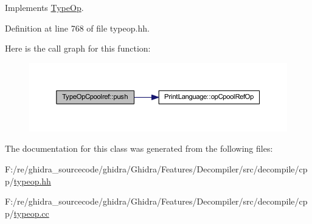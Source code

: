 Implements \mbox{\hyperlink{class_type_op_ac9c9544203ed74dabe6ac662b653b2af}{Type\+Op}}.



Definition at line 768 of file typeop.\+hh.

Here is the call graph for this function\+:
\nopagebreak
\begin{figure}[H]
\begin{center}
\leavevmode
\includegraphics[width=350pt]{class_type_op_cpoolref_a595f39446ffc5411594a13318baf64b5_cgraph}
\end{center}
\end{figure}


The documentation for this class was generated from the following files\+:\begin{DoxyCompactItemize}
\item 
F\+:/re/ghidra\+\_\+sourcecode/ghidra/\+Ghidra/\+Features/\+Decompiler/src/decompile/cpp/\mbox{\hyperlink{typeop_8hh}{typeop.\+hh}}\item 
F\+:/re/ghidra\+\_\+sourcecode/ghidra/\+Ghidra/\+Features/\+Decompiler/src/decompile/cpp/\mbox{\hyperlink{typeop_8cc}{typeop.\+cc}}\end{DoxyCompactItemize}
